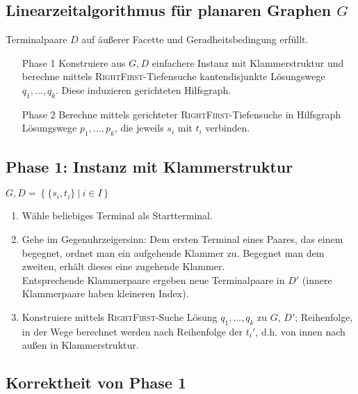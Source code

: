 \documentclass{article}
\newcommand{\set}[2]{\left\lbrace #1~|~#2 \right\rbrace}
\begin{document}
\subsection{Linearzeitalgorithmus für planaren Graphen $G$}
Terminalpaare $D$ auf äußerer Facette und Geradheitsbedingung erfüllt.\\

\begin{enumerate}
	\item[Phase 1] Konstruiere aus $G, D$ einfachere Instanz mit Klammerstruktur und berechne mittels \textsc{RightFirst}-Tiefensuche kantendisjunkte Lösungswege $q_1, \ldots, q_k$. Diese induzieren gerichteten Hilfsgraph.
	\item[Phase 2] Berechne mittels gerichteter \textsc{RightFirst}-Tiefensuche in Hilfsgraph Lösungswege $p_1,\ldots, p_k$, die jeweils $s_i$ mit $t_i$ verbinden.
\end{enumerate}

\subsection{Phase 1: Instanz mit Klammerstruktur}
$G, D = \set{\{s_i,t_i\}}{i \in I}$
\begin{enumerate}
	\item Wähle beliebiges Terminal als Startterminal.
	\item Gehe im Gegenuhrzeigersinn: Dem ersten Terminal eines Paares, das einem begegnet, ordnet man ein aufgehende Klammer zu. Begegnet man dem zweiten, erhält dieses eine zugehende Klammer.\\
	Entsprechende Klammerpaare ergeben neue Terminalpaare in $D'$ (innere Klammerpaare haben kleineren Index).
	\item Konstruiere mittels \textsc{RightFirst}-Suche Lösung $q_1,\ldots, q_k$ zu $G$, $D'$; Reihenfolge, in der Wege berechnet werden nach Reihenfolge der $t_i'$, d.h. von innen nach außen in Klammerstruktur.
\end{enumerate}

\subsection{Korrektheit von Phase 1}
\end{document}
